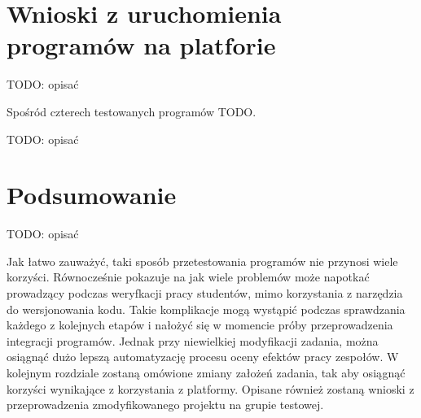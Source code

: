 \section{Wnioski z uruchomienia programów na platforie}

TODO: opisać

Spośród czterech testowanych programów TODO.


TODO: opisać


\section{Podsumowanie}
\label{verification_summary}


TODO: opisać

Jak łatwo zauważyć, taki sposób przetestowania programów nie przynosi wiele korzyści.
Równocześnie pokazuje na jak wiele problemów może napotkać prowadzący podczas weryfkacji pracy studentów, mimo korzystania z narzędzia do wersjonowania kodu.
Takie komplikacje mogą wystąpić podczas sprawdzania każdego z kolejnych etapów i nałożyć się w momencie próby przeprowadzenia integracji programów.
Jednak przy niewielkiej modyfikacji zadania, można osiągnąć dużo lepszą automatyzację procesu oceny efektów pracy zespołów.
W kolejnym rozdziale zostaną omówione zmiany założeń zadania, tak aby osiągnąć korzyści wynikające z korzystania z platformy.
Opisane również zostaną wnioski z przeprowadzenia zmodyfikowanego projektu na grupie testowej.

